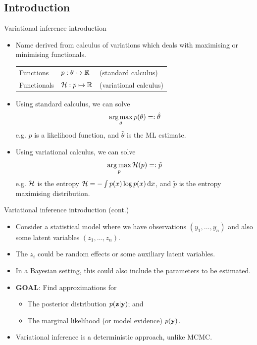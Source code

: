 \subsection{Introduction}

\begin{frame}{Variational inference introduction}
  \vspace{-12pt}
  \begin{itemize}
    \item Name derived from calculus of variations which deals with maximising or minimising functionals.
    \begin{table}
      \begin{tabular}{l  l  l }
      Functions   &$p:\theta \mapsto \mathbb{R}$  &(standard calculus) \\ 
      Functionals &${\mathcal H}:p \mapsto \mathbb{R}$     &(variational calculus) \\ 
      \end{tabular}
    \end{table}
  \item Using standard calculus, we can solve
  \[
    \operatorname*{arg\,max}_\theta p(\theta) =: \hat\theta
  \]
  e.g. $p$ is a likelihood function, and $\hat\theta$ is the ML estimate.
  \item Using variational calculus, we can solve
  \[
    \operatorname*{arg\,max}_p {\mathcal H}(p) =: \tilde p
  \]
  e.g. ${\mathcal H}$ is the entropy ${\mathcal H} = - \int p(x)\log p(x) \, \text{d} x$, and $\tilde p$ is the entropy maximising distribution.
  \end{itemize}
  \vspace{7pt}
\end{frame}

\begin{frame}{Variational inference introduction (cont.)}
  \begin{itemize}\setlength\itemsep{0.8em}
    \item Consider a statistical model where we have observations $(y_1, \dots, y_n)$ and also some latent variables $(z_1, \dots, z_n)$.
    \item The $z_i$ could be random effects or some auxiliary latent variables.
    \item In a Bayesian setting, this could also include the parameters to be estimated.
    \item \textbf{GOAL}: Find approximations for
    \begin{itemize}
      \item The posterior distribution $p({\mathbf z}|{\mathbf y})$; and
      \item The marginal likelihood (or model evidence) $p({\mathbf y})$.
    \end{itemize}
    \item Variational inference is a deterministic approach, unlike MCMC.
  \end{itemize}
\end{frame}

